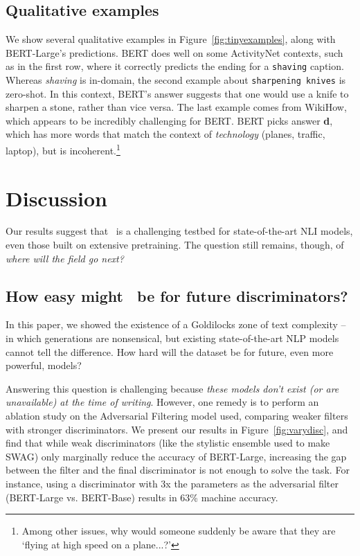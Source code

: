 \subsection{Qualitative examples} We show several qualitative examples in Figure~\ref{fig:tinyexamples}, along with BERT-Large's predictions. BERT does well on some ActivityNet contexts, such as in the first row, where it correctly predicts the ending for a \texttt{shaving} caption. Whereas \emph{shaving} is in-domain, the second example about \texttt{sharpening knives} is zero-shot. In this context, BERT's answer suggests that one would use a knife to sharpen a stone, rather than vice versa. The last example comes from WikiHow, which appears to be incredibly challenging for BERT. BERT picks answer \textbf{d}, which has more words that match the context of \emph{technology} (planes, traffic, laptop), but is incoherent.\footnote{Among other issues, why would someone suddenly be aware that they are `flying at high speed on a plane...?'}

\section{Discussion}

Our results suggest that {}~is a challenging testbed for state-of-the-art NLI models, even those built on extensive pretraining. The question still remains, though, of \emph{where will the field go next?}

\subsection{How easy might {}~be for future discriminators?} In this paper, we showed the existence of a Goldilocks zone of text complexity -- in which generations are nonsensical, but existing state-of-the-art NLP models cannot tell the difference. How hard will the dataset be for future, even more powerful, models? 

Answering this question is challenging because \emph{these models don't exist (or are unavailable) at the time of writing}. However, one remedy is to perform an ablation study on the Adversarial Filtering model used, comparing weaker filters with stronger discriminators. We present our results in Figure~\ref{fig:varydisc}, and find that while weak discriminators (like the stylistic ensemble used to make SWAG) only marginally reduce the accuracy of BERT-Large, increasing the gap between the filter and the final discriminator is not enough to solve the task. For instance, using a discriminator with 3x the parameters as the adversarial filter (BERT-Large vs. BERT-Base) results in 63\% machine accuracy.

